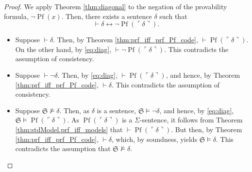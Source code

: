 \setcounter{equation}{0}
\begin{proof}
    \leanok
    We apply Theorem \ref{thm:diagonal} to the negation of the provability formula, 
    $\neg\operatorname{Pf}(x)$.
    Then, there exists a sentence $\delta$ such that
    \begin{equation}
        \label{eq:diag}
        \vdash \delta \leftrightarrow \neg \operatorname{Pf}(\ulcorner{\delta}\urcorner).
    \end{equation}
    \begin{itemize}
        \item Suppose $\vdash \delta$. Then, by Theorem \ref{thm:prf_iff_prf_Pf_code},
        $\vdash \operatorname{Pf}(\ulcorner{\delta}\urcorner)$.
        On the other hand, by \ref{eq:diag}, 
        $\vdash \neg \operatorname{Pf}(\ulcorner{\delta}\urcorner)$.
        This contradicts the assumption of consistency.
        \item Suppose $\vdash \neg \delta$. Then, by \ref{eq:diag},
        $\vdash \operatorname{Pf}(\ulcorner{\delta}\urcorner)$, and hence, by
        Theorem \ref{thm:prf_iff_prf_Pf_code}, $\vdash \delta$.
        This contradicts the assumption of consistency.
        \item Suppose $\mathfrak{S} \not\vDash \delta$. 
        Then, as $\delta$ is a sentence, $\mathfrak{S} \vDash \neg\delta$, and hence,
        by \ref{eq:diag}, $\mathfrak{S} \vDash \operatorname{Pf}(\ulcorner{\delta}\urcorner)$.
        As $\operatorname{Pf}(\ulcorner{\delta}\urcorner)$ is a $\Sigma$-sentence, it follows from 
        Theorem \ref{thm:stdModel.prf_iff_models} that
        $\vdash \operatorname{Pf}(\ulcorner{\delta}\urcorner)$. 
        But then, by Theorem \ref{thm:prf_iff_prf_Pf_code}, $\vdash \delta$,
        which, by soundness, yields $\mathfrak{S} \vDash \delta$.
        This contradicts the assumption that $\mathfrak{S} \not\vDash \delta$.
    \end{itemize}

\end{proof}